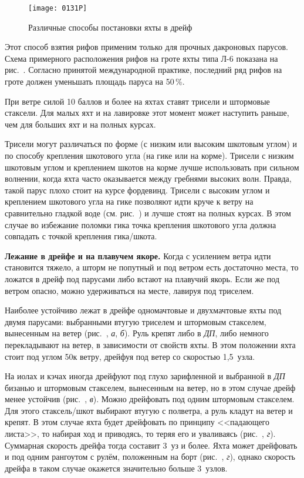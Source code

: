 \begin{figure*}[h]
  \centering{}
  \texttt{[image: 0131P]}
  \caption{Различные способы постановки яхты в дрейф}
  \label{fig:131}
\end{figure*}

Этот способ взятия рифов применим только для прочных дакроновых
парусов. Схема примерного расположения рифов на гроте яхты типа Л-6
показана на рис.~. Согласно принятой международной практике,
последний ряд рифов на гроте должен уменьшать площадь паруса на
50\,\%.

При ветре силой 10 баллов и более на яхтах ставят трисели и штормовые
стаксели. Для малых яхт и на лавировке этот момент может наступить
раньше, чем для больших яхт и на полных курсах.

Трисели могут различаться по форме (с низким или высоким шкотовым
углом) и по способу крепления шкотового угла (на гике или на
корме). Трисели с низким шкотовым углом и креплением шкотов на корме
лучше использовать при сильном волнении, когда яхта часто оказывается
между гребнями высоких волн. Правда, такой парус плохо стоит на курсе
фордевинд. Трисели с высоким углом и креплением шкотового угла на гике
позволяют идти круче к ветру на сравнительно гладкой воде
(см. рис.~) и лучше стоят на полных курсах. В этом случае во
избежание поломки гика точка крепления шкотового угла должна совпадать
с точкой крепления гика\-/шкота.

\textbf{Лежание в дрейфе и на плавучем
  якоре.} Когда с усилением ветра
идти становится тяжело, а шторм не попутный и под ветром есть
достаточно места, то ложатся в дрейф под парусами либо встают на
плавучий якорь. Если же под ветром опасно, можно удерживаться на
месте, лавируя под триселем.

Наиболее устойчиво лежат в дрейфе одномачтовые и двухмачтовые яхты под
двумя парусами: выбранными втугую триселем и штормовым стакселем,
вынесенным на ветер (рис.~, \textit{а}, \textit{б}). Руль
крепят либо в \textit{ДП}, либо немного перекладывают на ветер, в
зависимости от свойств яхты. В этом положении яхта стоит под углом
50\gr к ветру, дрейфуя под ветер со скоростью 1,5~узла.

На иолах и кэчах иногда дрейфуют под глухо зарифленной и выбранной в
\textit{ДП} бизанью и штормовым стакселем, вынесенным на ветер, но в
этом случае дрейф менее устойчив (рис.~, \textit{в}). Можно
дрейфовать под одним штормовым стакселем. Для этого стаксель\-/шкот
выбирают втугую с полветра, а руль кладут на ветер и крепят. В этом
случае яхта будет дрейфовать по принципу <<падающего листа>>, то
набирая ход и приводясь, то теряя его и уваливаясь (рис.~,
\textit{г}). Суммарная скорость дрейфа тогда составит 3~уз и
более. Яхта может дрейфовать и под одним рангоутом с рулём, положенным
на борт (рис.~, \textit{г}), однако скорость дрейфа в таком
случае окажется значительно больше 3~узлов.


